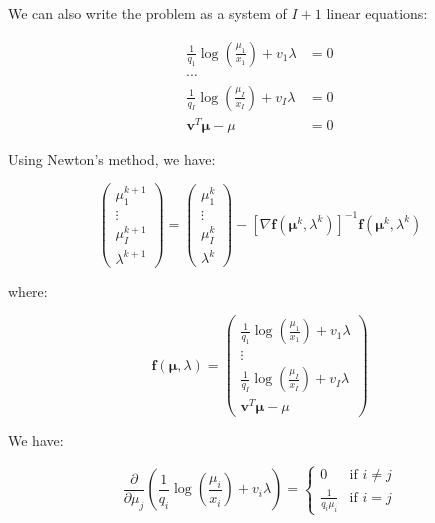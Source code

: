 \documentclass{tex/note}
\begin{document}
We can also write the problem as a system of $I + 1$ linear equations:

\begin{align*}
\frac{1}{q_1} \log \left( \frac{\mu_1}{x_1} \right) + v_1 \lambda &= 0 \\
\cdots & \\
\frac{1}{q_I} \log \left( \frac{\mu_I}{x_I} \right) + v_I \lambda &= 0 \\
\bm{v}^T \bm{\mu} - \mu &= 0
\end{align*}

Using Newton's method, we have:

\begin{equation*}
\begin{pmatrix} \mu_1^{k + 1} \\ \vdots \\ \mu_I^{k + 1} \\ \lambda^{k + 1} \end{pmatrix} = \begin{pmatrix} \mu_1^k \\ \vdots \\ \mu_I^k \\ \lambda^k \end{pmatrix} - \left[ \nabla \bm{f} \left( \bm{\mu}^k , \lambda^k \right) \right] ^{-1} \bm{f} \left( \bm{\mu}^k , \lambda^k \right)
\end{equation*}

where:

\begin{equation*}
\bm{f} \left( \bm{\mu} , \lambda \right) = \begin{pmatrix} \frac{1}{q_1} \log \left( \frac{\mu_1}{x_ 1} \right) + v_1 \lambda \\ \vdots \\ \frac{1}{q_I} \log \left( \frac{\mu_I}{x_ I} \right) + v_I \lambda \\ \bm{v}^T \bm{\mu} - \mu\end{pmatrix}
\end{equation*}

We have:

\begin{equation*}
\frac{\partial}{\partial \mu_j} \left( \frac{1}{q_i} \log \left( \frac{\mu_i}{x_i} \right) + v_i \lambda \right) =
\begin{cases}
0 & \text{if } i \neq j \\
\frac{1}{q_i \mu_i} & \text{if } i = j
\end{cases}
\end{equation*}
\end{document}
